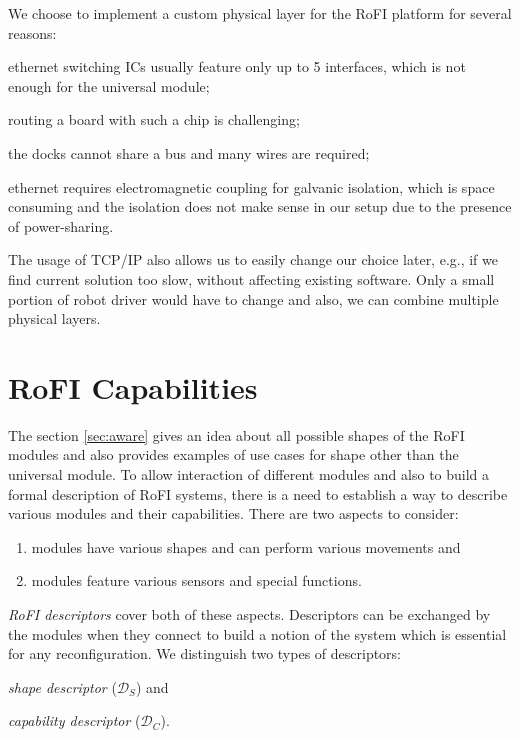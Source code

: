 We choose to implement a custom physical layer for the RoFI platform
for several reasons:
\begin{enumerate*}
    \item ethernet switching ICs usually feature only up to 5 interfaces, which
    is not enough for the universal module;
    \item routing a board with such a chip is challenging;
    \item the docks cannot share a bus and many wires are required;
    \item ethernet requires electromagnetic coupling for galvanic isolation,
    which is space consuming and the isolation does not make sense in our setup
    due to the presence of power-sharing.
\end{enumerate*}

The usage of TCP/IP also allows us to easily change our choice later, e.g., if
we find current solution too slow, without affecting existing software. Only a
small portion of robot driver would have to change and also, we can combine
multiple physical layers.


\section{RoFI Capabilities}\label{sec:capabilities}

The section \ref{sec:aware} gives an idea about all possible shapes of the RoFI
modules and also provides examples of use cases for shape other than the
universal module. To allow interaction of different modules and also to build
a formal description of RoFI systems, there is a need to establish a way to
describe various modules and their capabilities. There are two aspects to
consider:
\begin{enumerate}
    \item modules have various shapes and can perform various movements and
    \item modules feature various sensors and special functions.
\end{enumerate}

\emph{RoFI descriptors} cover both of these aspects. Descriptors can be
exchanged by the modules when they connect to build a notion of the system which
is essential for any reconfiguration. We distinguish two types of descriptors:
\begin{enumerate*}
    \item \emph{shape descriptor} ($\mathcal{D}_S$) and
    \item \emph{capability descriptor} ($\mathcal{D}_C$).
\end{enumerate*}

